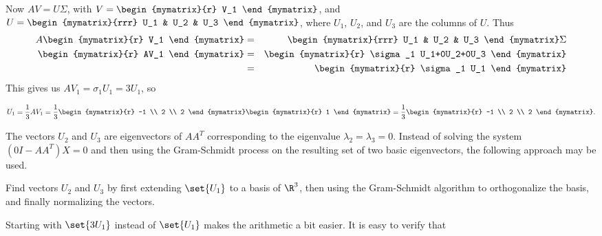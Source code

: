 \begin{solution}
Now $AV=U\Sigma$, with
$V=\begin{mymatrix}{r} V_1 \end{mymatrix}$,
and $U=\begin{mymatrix}{rrr} U_1 & U_2 & U_3 \end{mymatrix}$,
where $U_1$, $U_2$, and $U_3$ are the columns of $U$.
Thus
\begin{eqnarray*}
A\begin{mymatrix}{r} V_1 \end{mymatrix}
&=& \begin{mymatrix}{rrr} U_1 & U_2 & U_3 \end{mymatrix}\Sigma\\
\begin{mymatrix}{r} AV_1 \end{mymatrix}
&=& \begin{mymatrix}{r} \sigma_1 U_1+0U_2+0U_3 \end{mymatrix}\\
&=& \begin{mymatrix}{r} \sigma_1 U_1 \end{mymatrix}
\end{eqnarray*}
This gives us $AV_1=\sigma_1 U_1= 3U_1$, so

\[ U_1 = \frac{1}{3}AV_1
= \frac{1}{3}
\begin{mymatrix}{r} -1 \\ 2 \\ 2 \end{mymatrix}
\begin{mymatrix}{r} 1 \end{mymatrix}
= \frac{1}{3}
\begin{mymatrix}{r} -1 \\ 2 \\ 2 \end{mymatrix}.\]

The vectors $U_2$ and $U_3$ are eigenvectors of $AA^T$ corresponding
to the eigenvalue $\lambda_2=\lambda_3=0$.
Instead of solving the system $(0I-AA^T)X= 0$ and then using the
Gram-Schmidt process on the resulting set of
two basic eigenvectors, the following approach may be used.

Find vectors $U_2$ and $U_3$ by first extending $\set{U_1}$ to a basis of
$\R^3$, then using the Gram-Schmidt algorithm to orthogonalize the basis,
and finally normalizing the vectors.

Starting with $\set{3U_1}$ instead of $\set{U_1}$ makes the
arithmetic a bit easier.
It is easy to verify that


\end{solution}
